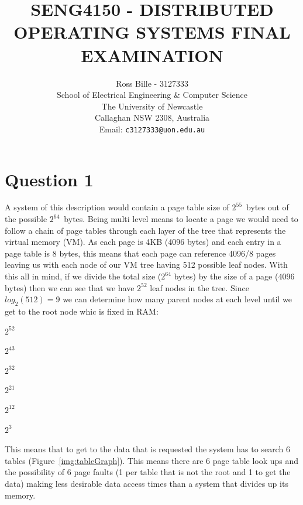 \documentclass[a4paper,12pt]{article}
\begin{document}
%
\title{\bf SENG4150 - DISTRIBUTED OPERATING SYSTEMS FINAL EXAMINATION}
%
\author{Ross Bille - 3127333\\
School of Electrical Engineering \& Computer Science\\
The University of Newcastle\\ Callaghan NSW 2308, Australia\\
Email: \texttt{c3127333@uon.edu.au} } 

\maketitle
\newpage
\section*{Question 1}

A system of this description would contain a page table size of $2^{55}$~bytes out of the possible $2^{64}$~bytes.
Being multi level means to locate a page we would need to follow a chain of page tables through each layer of the tree that represents the virtual memory (VM).
As each page is 4KB (4096 bytes) and each entry in a page table is 8 bytes, this means that each page can reference 4096/8 pages leaving us with each node of our VM tree having 512 possible leaf nodes.
With this all in mind, if we divide the total size ($2^{64}$ bytes) by the size of a page (4096 bytes) then we can see that we have $2^{52}$ leaf nodes in the tree.
Since $log_2(512) = 9$ we can determine how many parent nodes at each level until we get to the root node whic is fixed in RAM:
\begin{etaremune}
    \item{$2^52$}
    \item{$2^43$}
    \item{$2^32$}
    \item{$2^21$}
    \item{$2^12$}
    \item{$2^3$}
\end{etaremune}
This means that to get to the data that is requested the system has to search 6 tables (Figure~\ref{img:tableGraph}). 
This means there are 6 page table look ups and the possibility of 6 page faults (1 per table that is not the root and 1 to get the data) making less desirable data access times than a system that divides up its memory.
\end{document}
